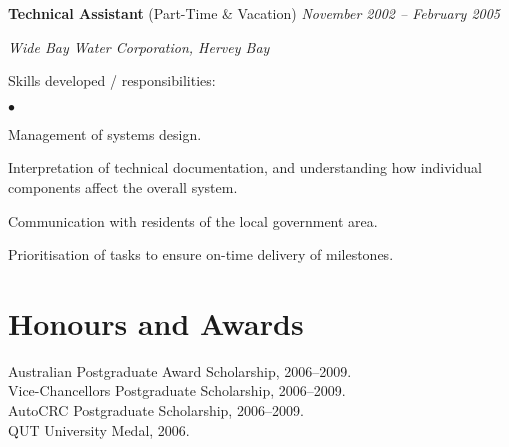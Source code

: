 \documentclass[margin,line]{resume}
\newenvironment{list1}{
  \begin{list}{}{%
      \setlength{\itemsep}{0in}
      \setlength{\parsep}{0in} \setlength{\parskip}{0in}
      \setlength{\topsep}{0in} \setlength{\partopsep}{0in}
      \setlength{\leftmargin}{0.17in}}}{\end{list}}
\newenvironment{list2}{
  \begin{list}{$\bullet$}{%
      \setlength{\itemsep}{0in}
      \setlength{\parsep}{0in} \setlength{\parskip}{0in}
      \setlength{\topsep}{0in} \setlength{\partopsep}{0in}
      \setlength{\leftmargin}{0.2in}}}{\end{list}}
\begin{document}
\begin{resume}
{\bf Technical Assistant} (Part-Time \& Vacation) \hfill {\it November 2002 -- February 2005}\\
\vspace{-0.85\baselineskip}
\begin{list1}
\item {\it Wide Bay Water Corporation, Hervey Bay}
\item Skills developed / responsibilities:
\begin{list2}
\item Management of systems design.
\item Interpretation of technical documentation, and understanding how individual components affect the overall system.
\item Communication with residents of the local government area.
\item Prioritisation of tasks to ensure on-time delivery of milestones.
\end{list2}
\end{list1}



\section{\sc Honours and Awards}
{ Australian Postgraduate Award Scholarship, 2006--2009.\\
\setlength{\parskip}{1ex}
Vice-Chancellors Postgraduate Scholarship, 2006--2009. \\
AutoCRC Postgraduate Scholarship, 2006--2009. \\
QUT University Medal, 2006.}



\end{resume}
\end{document}
